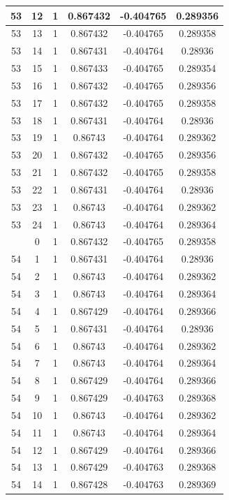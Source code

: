 \documentclass[12pt,a4paper]{article}
\numberwithin{equation}{section}
\numberwithin{figure}{section}
\numberwithin{table}{section}
\begin{document}
\begin{longtable}{|c|c|c|c|c|c|}
53 & 12 & 1 & 0.867432 & -0.404765 & 0.289356 \\ \hline
53 & 13 & 1 & 0.867432 & -0.404765 & 0.289358 \\ \hline
53 & 14 & 1 & 0.867431 & -0.404764 & 0.28936 \\ \hline
53 & 15 & 1 & 0.867433 & -0.404765 & 0.289354 \\ \hline
53 & 16 & 1 & 0.867432 & -0.404765 & 0.289356 \\ \hline
53 & 17 & 1 & 0.867432 & -0.404765 & 0.289358 \\ \hline
53 & 18 & 1 & 0.867431 & -0.404764 & 0.28936 \\ \hline
53 & 19 & 1 & 0.86743 & -0.404764 & 0.289362 \\ \hline
53 & 20 & 1 & 0.867432 & -0.404765 & 0.289356 \\ \hline
53 & 21 & 1 & 0.867432 & -0.404765 & 0.289358 \\ \hline
53 & 22 & 1 & 0.867431 & -0.404764 & 0.28936 \\ \hline
53 & 23 & 1 & 0.86743 & -0.404764 & 0.289362 \\ \hline
53 & 24 & 1 & 0.86743 & -0.404764 & 0.289364 \\ \hline
\pagebreak
54 & 0 & 1 & 0.867432 & -0.404765 & 0.289358 \\ \hline
54 & 1 & 1 & 0.867431 & -0.404764 & 0.28936 \\ \hline
54 & 2 & 1 & 0.86743 & -0.404764 & 0.289362 \\ \hline
54 & 3 & 1 & 0.86743 & -0.404764 & 0.289364 \\ \hline
54 & 4 & 1 & 0.867429 & -0.404764 & 0.289366 \\ \hline
54 & 5 & 1 & 0.867431 & -0.404764 & 0.28936 \\ \hline
54 & 6 & 1 & 0.86743 & -0.404764 & 0.289362 \\ \hline
54 & 7 & 1 & 0.86743 & -0.404764 & 0.289364 \\ \hline
54 & 8 & 1 & 0.867429 & -0.404764 & 0.289366 \\ \hline
54 & 9 & 1 & 0.867429 & -0.404763 & 0.289368 \\ \hline
54 & 10 & 1 & 0.86743 & -0.404764 & 0.289362 \\ \hline
54 & 11 & 1 & 0.86743 & -0.404764 & 0.289364 \\ \hline
54 & 12 & 1 & 0.867429 & -0.404764 & 0.289366 \\ \hline
54 & 13 & 1 & 0.867429 & -0.404763 & 0.289368 \\ \hline
54 & 14 & 1 & 0.867428 & -0.404763 & 0.289369 \\ \hline

\end{longtable}
\end{document}
